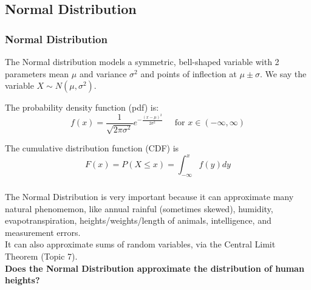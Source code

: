 \documentclass[t,xcolor=pdftex,dvipsnames,table]{beamer}
\begin{document}
\subsection[Normal Distribution]{Normal Distribution}

\begin{frame}[fragile,label=Normalpdf]\frametitle{Normal Distribution}

\begin{definition}
The \alert{Normal distribution} models a symmetric, bell-shaped variable with 2 parameters mean $\mu$ and variance $\sigma^2$ and points of inflection at $\mu \pm \sigma$. We say the variable $X \sim N(\mu, \sigma^2)$. 

\vspace{.5cm}
The probability density function (pdf) is:
\[ f(x)  =  \frac{1}{  \sqrt{2 \pi \sigma^2}}  e^{   -\frac{ (x-\mu)^2 }{2 \sigma^2  } }
\;\;\;\;\; \mbox{for }  x \in (- \infty, \infty) \]

The cumulative distribution function (CDF) is
\[ F(x) = P(X \leq x) = \int_{-\infty}^{x} f(y) dy \]
\end{definition}

\end{frame}


\begin{frame}[fragile]\frametitle{}

The Normal Distribution is very important because it can approximate many natural phenomemon, like annual rainful (sometimes skewed), humidity, evapotranspiration, heights/weights/length of animals, intelligence, and measurement errors. \\

\vspace{.5cm}
It can also approximate sums of random variables, via the Central Limit Theorem (Topic 7). \\

\vspace{.5cm}
{\bf Does the Normal Distribution approximate the distribution of human heights?}

\end{frame}
\end{document}
